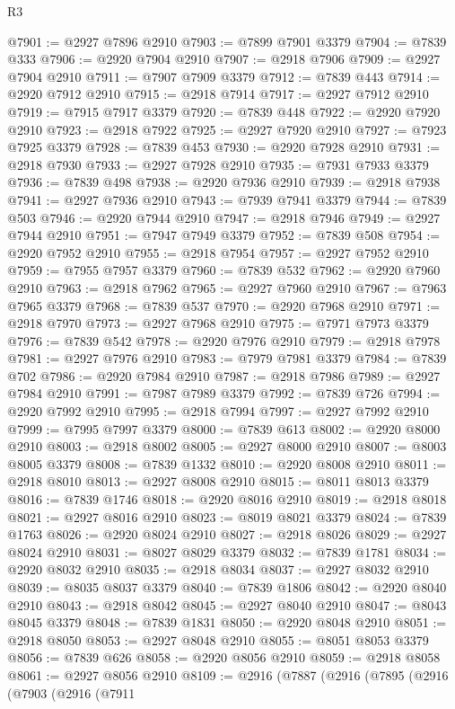 \begin{lexlean}{R3}
\begin{coremodule}
@7901 := @2927 @7896 @2910
@7903 := @7899 @7901 @3379
@7904 := @7839 @333
@7906 := @2920 @7904 @2910
@7907 := @2918 @7906
@7909 := @2927 @7904 @2910
@7911 := @7907 @7909 @3379
@7912 := @7839 @443
@7914 := @2920 @7912 @2910
@7915 := @2918 @7914
@7917 := @2927 @7912 @2910
@7919 := @7915 @7917 @3379
@7920 := @7839 @448
@7922 := @2920 @7920 @2910
@7923 := @2918 @7922
@7925 := @2927 @7920 @2910
@7927 := @7923 @7925 @3379
@7928 := @7839 @453
@7930 := @2920 @7928 @2910
@7931 := @2918 @7930
@7933 := @2927 @7928 @2910
@7935 := @7931 @7933 @3379
@7936 := @7839 @498
@7938 := @2920 @7936 @2910
@7939 := @2918 @7938
@7941 := @2927 @7936 @2910
@7943 := @7939 @7941 @3379
@7944 := @7839 @503
@7946 := @2920 @7944 @2910
@7947 := @2918 @7946
@7949 := @2927 @7944 @2910
@7951 := @7947 @7949 @3379
@7952 := @7839 @508
@7954 := @2920 @7952 @2910
@7955 := @2918 @7954
@7957 := @2927 @7952 @2910
@7959 := @7955 @7957 @3379
@7960 := @7839 @532
@7962 := @2920 @7960 @2910
@7963 := @2918 @7962
@7965 := @2927 @7960 @2910
@7967 := @7963 @7965 @3379
@7968 := @7839 @537
@7970 := @2920 @7968 @2910
@7971 := @2918 @7970
@7973 := @2927 @7968 @2910
@7975 := @7971 @7973 @3379
@7976 := @7839 @542
@7978 := @2920 @7976 @2910
@7979 := @2918 @7978
@7981 := @2927 @7976 @2910
@7983 := @7979 @7981 @3379
@7984 := @7839 @702
@7986 := @2920 @7984 @2910
@7987 := @2918 @7986
@7989 := @2927 @7984 @2910
@7991 := @7987 @7989 @3379
@7992 := @7839 @726
@7994 := @2920 @7992 @2910
@7995 := @2918 @7994
@7997 := @2927 @7992 @2910
@7999 := @7995 @7997 @3379
@8000 := @7839 @613
@8002 := @2920 @8000 @2910
@8003 := @2918 @8002
@8005 := @2927 @8000 @2910
@8007 := @8003 @8005 @3379
@8008 := @7839 @1332
@8010 := @2920 @8008 @2910
@8011 := @2918 @8010
@8013 := @2927 @8008 @2910
@8015 := @8011 @8013 @3379
@8016 := @7839 @1746
@8018 := @2920 @8016 @2910
@8019 := @2918 @8018
@8021 := @2927 @8016 @2910
@8023 := @8019 @8021 @3379
@8024 := @7839 @1763
@8026 := @2920 @8024 @2910
@8027 := @2918 @8026
@8029 := @2927 @8024 @2910
@8031 := @8027 @8029 @3379
@8032 := @7839 @1781
@8034 := @2920 @8032 @2910
@8035 := @2918 @8034
@8037 := @2927 @8032 @2910
@8039 := @8035 @8037 @3379
@8040 := @7839 @1806
@8042 := @2920 @8040 @2910
@8043 := @2918 @8042
@8045 := @2927 @8040 @2910
@8047 := @8043 @8045 @3379
@8048 := @7839 @1831
@8050 := @2920 @8048 @2910
@8051 := @2918 @8050
@8053 := @2927 @8048 @2910
@8055 := @8051 @8053 @3379
@8056 := @7839 @626
@8058 := @2920 @8056 @2910
@8059 := @2918 @8058
@8061 := @2927 @8056 @2910
@8109 := @2916
    (@7887
      (@2916
        (@7895
          (@2916
            (@7903
              (@2916
                (@7911

\end{coremodule}
\end{lexlean}
